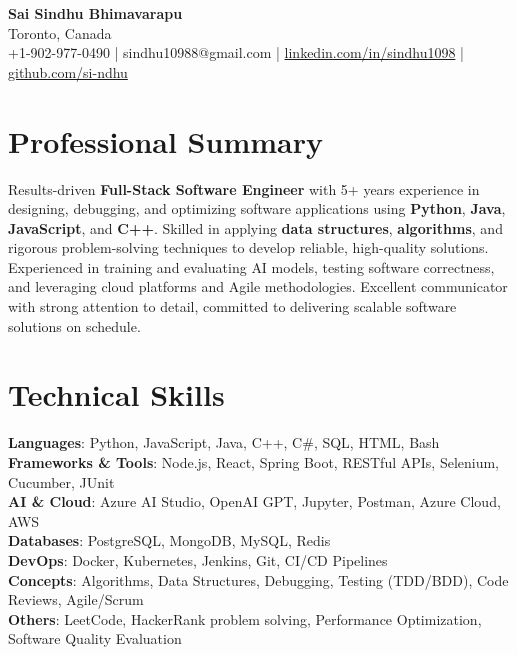 \documentclass[letterpaper,11pt]{article}
\begin{document}
\begin{center}
  {\Large \textbf{Sai Sindhu Bhimavarapu}} \\
  Toronto, Canada \\
  +1-902-977-0490 \enspace | \enspace sindhu10988@gmail.com \enspace | \enspace \href{https://www.linkedin.com/in/sindhu1098/}{linkedin.com/in/sindhu1098} \enspace | \enspace \href{https://github.com/si-ndhu}{github.com/si-ndhu}
\end{center}

\section{Professional Summary}
  \begin{itemize}[leftmargin=0.15in, label={}]
    \small{\item{
     Results-driven \textbf{Full-Stack Software Engineer} with 5+ years experience in designing, debugging, and optimizing software applications using \textbf{Python}, \textbf{Java}, \textbf{JavaScript}, and \textbf{C++}. Skilled in applying \textbf{data structures}, \textbf{algorithms}, and rigorous problem-solving techniques to develop reliable, high-quality solutions. Experienced in training and evaluating AI models, testing software correctness, and leveraging cloud platforms and Agile methodologies. Excellent communicator with strong attention to detail, committed to delivering scalable software solutions on schedule.
    }}
  \end{itemize}
\vspace{-16pt}

\section{Technical Skills}
 \begin{itemize}[leftmargin=0.15in, label={}]
    \small{\item{
     \textbf{Languages}: Python, JavaScript, Java, C++, C\#, SQL, HTML, Bash \\
     \textbf{Frameworks \& Tools}: Node.js, React, Spring Boot, RESTful APIs, Selenium, Cucumber, JUnit \\
     \textbf{AI \& Cloud}: Azure AI Studio, OpenAI GPT, Jupyter, Postman, Azure Cloud, AWS \\
     \textbf{Databases}: PostgreSQL, MongoDB, MySQL, Redis \\
     \textbf{DevOps}: Docker, Kubernetes, Jenkins, Git, CI/CD Pipelines \\
     \textbf{Concepts}: Algorithms, Data Structures, Debugging, Testing (TDD/BDD), Code Reviews, Agile/Scrum \\
     \textbf{Others}: LeetCode, HackerRank problem solving, Performance Optimization, Software Quality Evaluation
    }}
 \end{itemize}
\vspace{-16pt}
\end{document}

